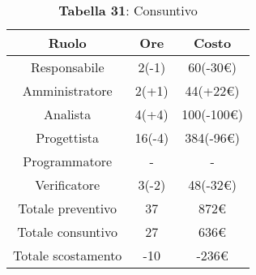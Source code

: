 \begin{table}[H]
	\centering
	\renewcommand{\arraystretch}{1.5}
	\begin{tabular}{|c|c|c|}
		\hline
		\rowcolor{lighter-grayer}
		Ruolo & Ore & Costo \\ \hline
		Responsabile & 2(-1) & 60(-30\euro) \\ \hline
		Amministratore & 2(+1) & 44(+22\euro) \\ \hline
		Analista & 4(+4) & 100(-100\euro) \\ \hline
		Progettista & 16(-4) & 384(-96\euro) \\ \hline
		Programmatore & - & - \\ \hline
		Verificatore & 3(-2) & 48(-32\euro) \\ \hline
		Totale preventivo & 37 & 872\euro \\ \hline
		Totale consuntivo & 27 & 636\euro \\ \hline
		Totale scostamento & -10 & -236\euro \\ \hline
	\end{tabular}
	\caption*{\textbf{Tabella 31}: Consuntivo\\}
\end{table}

